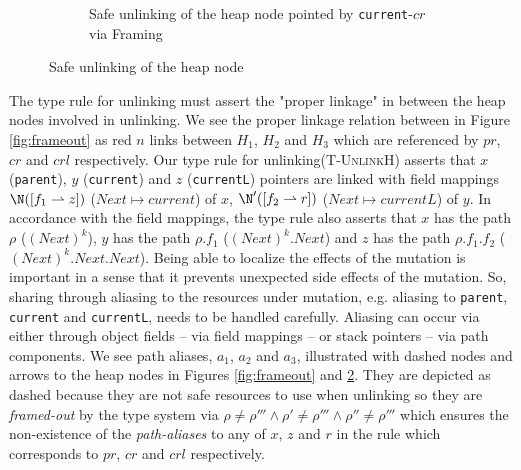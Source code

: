 \begin{figure}[H]
\begin{subfigure}[b]{.4\linewidth}

 \caption{Safe unlinking of the heap node pointed by \texttt{current}-$cr$ via \textsf{Framing}}
 \label{fig:unlinkframeout}
 \end{subfigure}
 \caption{Safe unlinking of the heap node}\vspace{-2mm}
 \end{figure}
The type rule for unlinking must assert the "proper linkage" in between the heap nodes involved in unlinking. We see the proper linkage relation between in Figure \ref{fig:frameout} as red $n$ links between $H_1$, $H_2$ and $H_3$ which are referenced by $pr$, $cr$ and $crl$ respectively. Our type rule for unlinking(\textsc{T-UnlinkH}) asserts that $x$ (\texttt{parent}), $y$ (\texttt{current}) and $z$ (\texttt{currentL}) pointers are linked with field mappings $\N([f_1\rightharpoonup z])$ ($Next \mapsto current$) of $x$, $\N'([f_2\rightharpoonup r])$ ($Next \mapsto currentL$) of $y$. In accordance with the field mappings, the type rule also asserts that $x$ has the path $\rho$ ($(Next)^{k}$), $y$ has the path $\rho.f_1$ ($(Next)^{k}.Next$) and $z$ has the path $\rho.f_1.f_2$ ($(Next)^{k}.Next.Next$).
Being able to localize the effects of the mutation is important in a sense that it prevents unexpected side effects of the mutation. So, sharing through aliasing to the resources under mutation, e.g. aliasing to \texttt{parent}, \texttt{current} and \texttt{currentL}, needs to be handled carefully. Aliasing can occur via either through  object fields -- via field mappings -- or stack pointers -- via path components. We see path aliases, $a_1$, $a_2$ and $a_3$, illustrated with dashed nodes and arrows to the heap nodes in Figures \ref{fig:frameout} and \ref{fig:unlinkframeout}. They are depicted as dashed because they are not safe resources to use when unlinking so they are \textit{framed-out} by the type system via $\rho \neq \rho''' \land \rho' \neq \rho''' \land \rho'' \neq \rho'''$ which ensures the non-existence of the \textit{path-aliases} to any of $x$, $z$ and $r$ in the rule which corresponds to $pr$, $cr$ and $crl$ respectively. 
